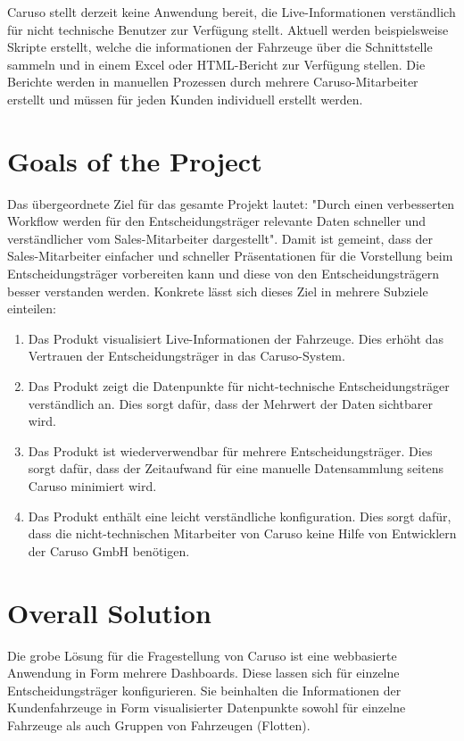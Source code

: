 Caruso stellt derzeit keine Anwendung bereit, die Live-Informationen verständlich für nicht technische Benutzer zur Verfügung stellt. Aktuell werden beispielsweise Skripte erstellt, welche die informationen der Fahrzeuge über die Schnittstelle sammeln und in einem Excel oder HTML-Bericht zur Verfügung stellen. Die Berichte werden in manuellen Prozessen durch mehrere Caruso-Mitarbeiter erstellt und müssen für jeden Kunden individuell erstellt werden.

\section{Goals of the Project}
Das übergeordnete Ziel für das gesamte Projekt lautet: "Durch einen verbesserten Workflow werden für den Entscheidungsträger relevante Daten schneller und verständlicher vom Sales-Mitarbeiter dargestellt". Damit ist gemeint, dass der Sales-Mitarbeiter einfacher und schneller Präsentationen für die Vorstellung beim Entscheidungsträger vorbereiten kann und diese von den Entscheidungsträgern besser verstanden werden. Konkrete lässt sich dieses Ziel in mehrere Subziele einteilen:
\begin{enumerate}
  \item Das Produkt visualisiert Live-Informationen der Fahrzeuge. Dies erhöht das Vertrauen der Entscheidungsträger in das Caruso-System.
  \item Das Produkt zeigt die Datenpunkte für nicht-technische Entscheidungsträger verständlich an. Dies sorgt dafür, dass der Mehrwert der Daten sichtbarer wird.
  \item Das Produkt ist wiederverwendbar für mehrere Entscheidungsträger. Dies sorgt dafür, dass der Zeitaufwand für eine manuelle Datensammlung seitens Caruso minimiert wird.
  \item Das Produkt enthält eine leicht verständliche konfiguration. Dies sorgt dafür, dass die nicht-technischen Mitarbeiter von Caruso keine Hilfe von Entwicklern der Caruso GmbH benötigen.
\end{enumerate}

\section{Overall Solution}
Die grobe Lösung für die Fragestellung von Caruso ist eine webbasierte Anwendung in Form mehrere Dashboards. Diese lassen sich für einzelne Entscheidungsträger konfigurieren. Sie beinhalten die Informationen der Kundenfahrzeuge in Form visualisierter Datenpunkte sowohl für einzelne Fahrzeuge als auch Gruppen von Fahrzeugen (Flotten).